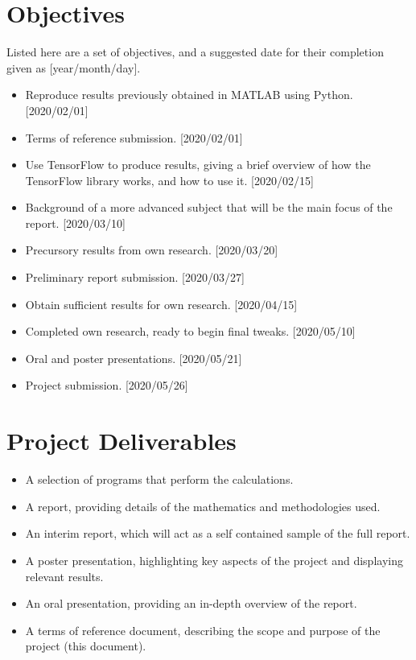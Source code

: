 \section*{Objectives}
Listed here are a set of objectives, and a suggested date for their completion\\
given as [year/month/day].
\begin{itemize}
    \item Reproduce results previously obtained in MATLAB using Python.
        [2020/02/01]

    \item Terms of reference submission. [2020/02/01]

    \item Use TensorFlow to produce results, giving a brief overview of how the
        TensorFlow library works, and how to use it. [2020/02/15]

    \item Background of a more advanced subject that will be the main focus of
        the report. [2020/03/10]

    \item Precursory results from own research. [2020/03/20]

    \item Preliminary report submission. [2020/03/27]

    \item Obtain sufficient results for own research. [2020/04/15]

    \item Completed own research, ready to begin final tweaks. [2020/05/10]

    \item Oral and poster presentations. [2020/05/21]

    \item Project submission. [2020/05/26]
\end{itemize}

\section*{Project Deliverables}
\begin{itemize}
    \item A selection of programs that perform the calculations.

    \item A report, providing details of the mathematics and methodologies used.

    \item An interim report, which will act as a self contained sample of the
        full report.

    \item A poster presentation, highlighting key aspects of the project and
        displaying relevant results.

    \item An oral presentation, providing an in-depth overview of the report.

    \item A terms of reference document, describing the scope and purpose of the
        project (this document).
\end{itemize}

